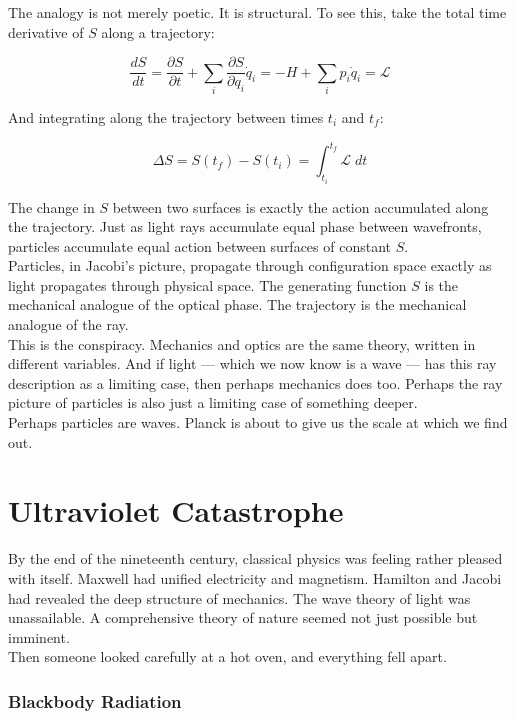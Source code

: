 \documentclass[krantz1,ChapterTOCs]{krantz}
\begin{document}
The analogy is not merely poetic. It is structural. To see this, take 
the total time derivative of $S$ along a trajectory:

\[
\frac{dS}{dt} = \frac{\partial S}{\partial t} + \sum_i 
\frac{\partial S}{\partial q_i}\dot{q}_i
= -H + \sum_i p_i \dot{q}_i = \mathcal{L}
\]

And integrating along the trajectory between times $t_i$ and $t_f$:

\[
\Delta S = S(t_f) - S(t_i) = \int_{t_i}^{t_f} \mathcal{L}\;dt
\]

The change in $S$ between two surfaces is exactly the action 
accumulated along the trajectory. Just as light rays accumulate 
equal phase between wavefronts, particles accumulate equal action 
between surfaces of constant $S$.\\

Particles, in Jacobi's picture, propagate through configuration 
space exactly as light propagates through physical space. The 
generating function $S$ is the mechanical analogue of the optical 
phase. The trajectory is the mechanical analogue of the ray.\\

This is the conspiracy. Mechanics and optics are the same theory, 
written in different variables. And if light --- which we now know 
is a wave --- has this ray description as a limiting case, then 
perhaps mechanics does too. Perhaps the ray picture of particles 
is also just a limiting case of something deeper.\\

Perhaps particles are waves. Planck is about to give us the scale 
at which we find out.\\

\part{Ultraviolet Catastrophe}

By the end of the nineteenth century, classical physics was feeling 
rather pleased with itself. Maxwell had unified electricity and 
magnetism. Hamilton and Jacobi had revealed the deep structure of 
mechanics. The wave theory of light was unassailable. A comprehensive 
theory of nature seemed not just possible but imminent.\\

Then someone looked carefully at a hot oven, and everything fell apart.\\

\section*{Blackbody Radiation}
\end{document}
